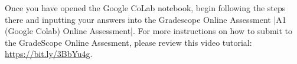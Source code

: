 


Once you have opened the Google CoLab notebook, begin following the steps there and inputting your answers into the Gradescope Online Assessment |A1 (Google Colab) Online Assessment|.
For more instructions on how to submit to the GradeScope Online Assesment, please review this video tutorial: \url{https://bit.ly/3BbYu4g}.

